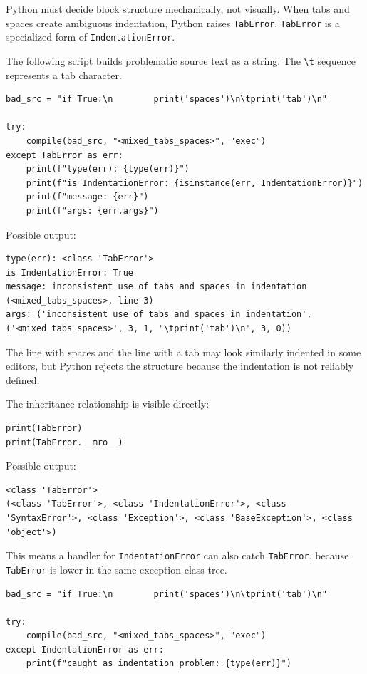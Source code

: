 \documentclass[a4paper,twoside]{report}
\begin{document}
Python must decide block structure mechanically, not visually. When tabs and spaces create ambiguous indentation, Python raises \texttt{TabError}. \texttt{TabError} is a specialized form of \texttt{IndentationError}.

The following script builds problematic source text as a string. The \texttt{\textbackslash t} sequence represents a tab character.

\begin{verbatim}
bad_src = "if True:\n        print('spaces')\n\tprint('tab')\n"

try:
    compile(bad_src, "<mixed_tabs_spaces>", "exec")
except TabError as err:
    print(f"type(err): {type(err)}")
    print(f"is IndentationError: {isinstance(err, IndentationError)}")
    print(f"message: {err}")
    print(f"args: {err.args}")
\end{verbatim}

Possible output:

\begin{verbatim}
type(err): <class 'TabError'>
is IndentationError: True
message: inconsistent use of tabs and spaces in indentation (<mixed_tabs_spaces>, line 3)
args: ('inconsistent use of tabs and spaces in indentation', ('<mixed_tabs_spaces>', 3, 1, "\tprint('tab')\n", 3, 0))
\end{verbatim}

The line with spaces and the line with a tab may look similarly indented in some editors, but Python rejects the structure because the indentation is not reliably defined.

The inheritance relationship is visible directly:

\begin{verbatim}
print(TabError)
print(TabError.__mro__)
\end{verbatim}

Possible output:

\begin{verbatim}
<class 'TabError'>
(<class 'TabError'>, <class 'IndentationError'>, <class 'SyntaxError'>, <class 'Exception'>, <class 'BaseException'>, <class 'object'>)
\end{verbatim}

This means a handler for \texttt{IndentationError} can also catch \texttt{TabError}, because \texttt{TabError} is lower in the same exception class tree.

\begin{verbatim}
bad_src = "if True:\n        print('spaces')\n\tprint('tab')\n"

try:
    compile(bad_src, "<mixed_tabs_spaces>", "exec")
except IndentationError as err:
    print(f"caught as indentation problem: {type(err)}")
\end{verbatim}
\end{document}
